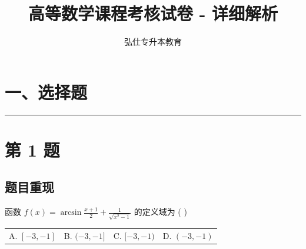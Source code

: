\documentclass[10pt, a4paper]{ctexart}
\newcommand{\problemheader}{
    \vspace{0.5cm}
    \noindent\rule[0.5ex]{\linewidth}{2pt} %
}
\begin{document}
\title{高等数学课程考核试卷 - 详细解析}
\author{弘仕专升本教育}
\date{}
\maketitle


\section*{一、选择题}

\problemheader
\section*{第 1 题}
\subsection*{题目重现}
函数 $f(x) = \arcsin \frac{x+1}{2} + \frac{1}{\sqrt{x^2-1}}$ 的定义域为 ( \quad ) \\
\begin{tabularx}{\linewidth}{@{} *{4}{X} @{}}
    A. $[-3,-1]$ & B. $(-3,-1]$ & C. $[-3,-1)$ & D. $(-3,-1)$
\end{tabularx}
\end{document}
